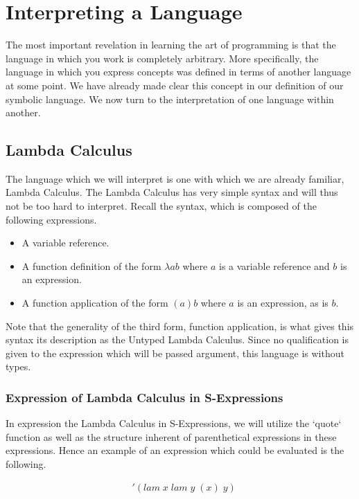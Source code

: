 
\chapter{Interpreting a Language}
The most important revelation in learning the art of programming is that the 
language in which you work is completely arbitrary. More specifically, the 
language in which you express concepts was defined in terms of another language 
at some point. We have already made clear this concept in our definition of our 
symbolic language. We now turn to the interpretation of one language within 
another.

\section{Lambda Calculus}
The language which we will interpret is one with which we are already familiar, 
Lambda Calculus. The Lambda Calculus has very simple syntax and will thus not 
be too hard to interpret. Recall the syntax, which is composed of the following 
expressions.

\begin{itemize}
  \item A variable reference.
  \item A function definition of the form $\lambda a b$ where $a$ is a variable reference and $b$ is an expression.
  \item A function application of the form $(a)b$ where $a$ is an expression, as is $b$.
\end{itemize}

Note that the generality of the third form, function application, is what gives 
this syntax its description as the Untyped Lambda Calculus. Since no 
qualification is given to the expression which will be passed argument, this 
language is without types.

\subsection{Expression of Lambda Calculus in S-Expressions}
In expression the Lambda Calculus in S-Expressions, we will utilize the `quote` 
function as well as the structure inherent of parenthetical expressions in these 
expressions. Hence an example of an expression which could be evaluated is the 
following.

\begin{align*}
& '(lam \; x \; lam \; y \; (x) \; y)
\end{align*}

